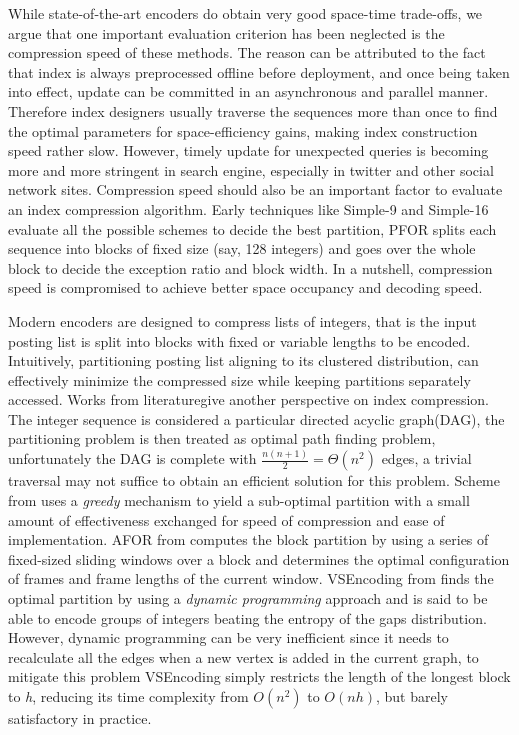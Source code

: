 \documentclass[runningheads,a4paper]{llncs}
\begin{document}
While state-of-the-art encoders do obtain very good space-time trade-offs, we argue that one important evaluation criterion has been neglected is the compression speed of these methods\cite{manning2008introduction,silvestri2010vsencoding,yan2009inverted}. The reason can be attributed to the fact that index is always preprocessed offline before deployment, and once being taken into effect, update can be committed in an asynchronous and parallel manner. Therefore index designers usually traverse the sequences more than once to find the optimal parameters for space-efficiency gains, making index construction speed rather slow. However, timely update for unexpected queries is becoming more and more stringent in search engine, especially in twitter and other social network sites. Compression speed should also be an important factor to evaluate an index compression algorithm. Early techniques like Simple-9 and Simple-16\cite{anh2005inverted,anh2010index} evaluate all the possible schemes to decide the best partition, PFOR\cite{lemire2015decoding,yan2009inverted,zobel2006inverted} splits each sequence into blocks of fixed size (say, 128 integers) and goes over the whole block to decide the exception ratio and block width. In a nutshell, compression speed is compromised to achieve better space occupancy and decoding speed.

Modern encoders are designed to compress lists of integers, that is the input posting list is split into blocks with fixed or variable lengths to be encoded. Intuitively, partitioning posting list aligning to its clustered distribution, can effectively minimize the compressed size while keeping partitions separately accessed. Works from 
literature\cite{anh2004index,delbru2010adaptive,silvestri2010vsencoding}give another perspective on index compression. The integer sequence is considered a particular directed acyclic graph(DAG), the partitioning problem is then treated as optimal path finding problem, unfortunately the DAG is complete with $ \frac{n\left( n+1\right)}{2} = \Theta\left( n^{2}\right) $ edges, a trivial traversal may not suffice to obtain an efficient solution for this problem. Scheme from \cite{anh2004index} uses a \textit{greedy} mechanism to yield a sub-optimal partition with a small amount of effectiveness exchanged for speed of compression and ease of implementation. AFOR from \cite{delbru2010adaptive} computes the block partition by using a series of fixed-sized sliding windows over a block and determines the optimal configuration of frames and frame lengths of the current window. VSEncoding from \cite{silvestri2010vsencoding} finds the optimal partition by using a \textit{dynamic programming} approach and is said to be able to encode groups of integers beating the entropy of the gaps distribution. However, dynamic programming can be very inefficient since it needs to recalculate all the edges when a new vertex is added in the current graph, to mitigate this problem VSEncoding simply restricts the length of the longest block to \textit{h}, reducing its time complexity from $O(n^{2})$ to $O(nh)$, but barely satisfactory in practice.
\end{document}
